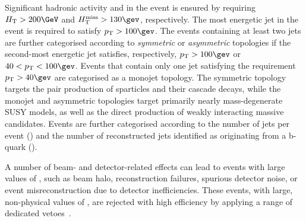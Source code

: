 Significant hadronic activity and \ptvecmiss in the event is ensured
by requiring $\scalht > 200\GeV$ and $\mht > 130\gev$, respectively.
The most energetic jet in the event is required to satisfy $\Pt >
100\gev$. The events containing at least two jets are further
categorised according to {\it symmetric} or {\it asymmetric}
topologies if the second-most energetic jet satisfies, respectively,
$\Pt > 100\gev$ or $40 < \Pt < 100\gev$. Events that contain only one
jet satisfying the requirement $\Pt > 40\gev$ are categorised as a
{\ir monojet} topology. The symmetric topology targets the pair
production of sparticles and their cascade decays, while the monojet
and asymmetric topologies target primarily nearly mass-degenerate SUSY
models, as well as the direct production of weakly interacting massive
candidates. Events are further categorised according to the number of
jets per event (\njet) and the number of reconstructed jets identified
as originating from a b-quark (\nb).

A number of beam- and detector-related effects can lead to events with
large values of \ETmiss, such as beam halo, reconstruction failures,
spurious detector noise, or event misreconstruction due to detector
inefficiencies. These events, with large, non-physical values of
\ETmiss, are rejected with high efficiency by applying a range of
dedicated vetoes~\cite{RA1Paper2012, cms-met}.


